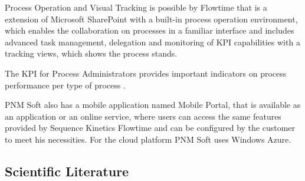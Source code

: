 Process Operation and Visual Tracking is possible by Flowtime that is a extension of Microsoft SharePoint with a built-in process operation environment, which enables the collaboration on processes in a familiar interface and includes advanced task management, delegation and monitoring of KPI capabilities with a tracking views, which shows the process stands.

The KPI for Process Administrators provides important indicators on process performance per type of process \cite{PNMSOFT}.

PNM Soft also has a mobile application named Mobile Portal, that is available as an application or an online service, where users can access the same features provided by Sequence Kinetics Flowtime and can be configured by the customer to meet his necessities. 
For the cloud platform PNM Soft uses Windows Azure.

\subsection{Scientific Literature} \label{ScientificStudies}

